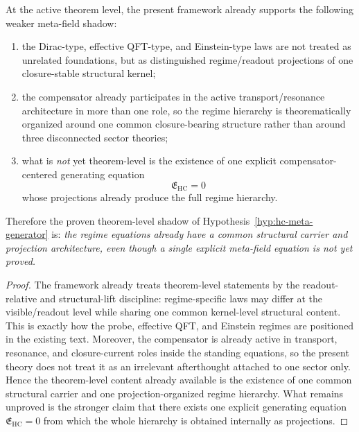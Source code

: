 \begin{theorem}
\label{thm:theorem-level-shadow-hc-meta-field-generator}
At the active theorem level, the present framework already supports the following weaker meta-field shadow:
\begin{enumerate}[leftmargin=2em,label=(\roman*)]
  \item the Dirac-type, effective QFT-type, and Einstein-type laws are not treated as unrelated foundations, but as distinguished regime/readout projections of one closure-stable structural kernel;
  \item the compensator already participates in the active transport/resonance architecture in more than one role, so the regime hierarchy is theorematically organized around one common closure-bearing structure rather than around three disconnected sector theories;
  \item what is \emph{not} yet theorem-level is the existence of one explicit compensator-centered generating equation
  \[
    \mathfrak E_{\mathrm{HC}}=0
  \]
  whose projections already produce the full regime hierarchy.
\end{enumerate}
Therefore the proven theorem-level shadow of Hypothesis~\ref{hyp:hc-meta-generator} is:
\emph{the regime equations already have a common structural carrier and projection architecture, even though a single explicit meta-field equation is not yet proved.}
\end{theorem}

\begin{proof}
The framework already treats theorem-level statements by the readout-relative and structural-lift discipline: regime-specific laws may differ at the visible/readout level while sharing one common kernel-level structural content. This is exactly how the probe, effective QFT, and Einstein regimes are positioned in the existing text. Moreover, the compensator is already active in transport, resonance, and closure-current roles inside the standing equations, so the present theory does not treat it as an irrelevant afterthought attached to one sector only. Hence the theorem-level content already available is the existence of one common structural carrier and one projection-organized regime hierarchy. What remains unproved is the stronger claim that there exists one explicit generating equation $\mathfrak E_{\mathrm{HC}}=0$ from which the whole hierarchy is obtained internally as projections.
\end{proof}

